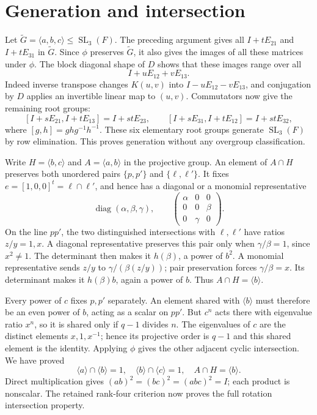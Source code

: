 \documentclass[11pt,a4paper]{article}
\newcommand{\SL}{\operatorname{SL}}\newcommand{\PSL}{\operatorname{PSL}}
\begin{document}
\section{Generation and intersection}
Let $\widetilde G=\langle a,b,c\rangle\leq\SL_3(F)$.
The preceding argument gives all $I+tE_{21}$ and $I+tE_{31}$ in
$\widetilde G$. Since $\phi$ preserves $\widetilde G$, it also gives
the images of all these matrices under $\phi$. The block diagonal
shape of $D$ shows that these images range over all
\[
                         I+uE_{12}+vE_{13}.
\]
Indeed inverse transpose changes $K(u,v)$ into
$I-uE_{12}-vE_{13}$, and conjugation by $D$ applies an invertible
linear map to $(u,v)$. Commutators now give the remaining root groups:
\[
 [I+sE_{21},I+tE_{13}]=I+stE_{23},\qquad
 [I+sE_{31},I+tE_{12}]=I+stE_{32},
\]
where $[g,h]=ghg^{-1}h^{-1}$. These six elementary root groups generate
$\SL_3(F)$ by row elimination. This proves generation without any
overgroup classification.

Write $H=\langle b,c\rangle$ and $A=\langle a,b\rangle$ in the
projective group. An element of $A\cap H$ preserves both unordered
pairs $\{p,p'\}$ and $\{\ell,\ell'\}$. It fixes
$e=[1,0,0]^t=\ell\cap\ell'$, and hence has a diagonal or a
monomial representative
\[
 \operatorname{diag}(\alpha,\beta,\gamma),\qquad
 \begin{pmatrix}\alpha&0&0\\0&0&\beta\\0&\gamma&0\end{pmatrix}.
\]
On the line $pp'$, the two distinguished intersections with $\ell,\ell'$
have ratios $z/y=1,x$. A diagonal representative preserves this pair
only when $\gamma/\beta=1$, since $x^2\ne1$. The determinant then
makes it $h(\beta)$, a power of $b^2$. A monomial representative
sends $z/y$ to $\gamma/(\beta(z/y))$; pair preservation forces
$\gamma/\beta=x$. Its determinant makes it $h(\beta)b$, again a
power of $b$. Thus $A\cap H=\langle b\rangle$.

Every power of $c$ fixes $p,p'$ separately. An element shared with
$\langle b\rangle$ must therefore be an even power of $b$, acting
as a scalar on $pp'$. But $c^n$ acts there with eigenvalue ratio
$x^n$, so it is shared only if $q-1$ divides $n$. The eigenvalues of
$c$ are the distinct elements $x,1,x^{-1}$; hence its projective
order is $q-1$ and this shared element is the identity. Applying
$\phi$ gives the other adjacent cyclic intersection. We have proved
\[
 \langle a\rangle\cap\langle b\rangle=1,
 \quad \langle b\rangle\cap\langle c\rangle=1,
 \quad A\cap H=\langle b\rangle.
\]
Direct multiplication gives $(ab)^2=(bc)^2=(abc)^2=I$;
each product is nonscalar. The retained rank-four criterion now proves
the full rotation intersection property.
\end{document}
